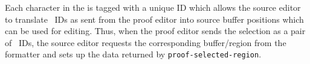 Each character in the {\IRS} is tagged with a unique ID which allows the
source editor to translate \tbox~IDs as sent from the proof editor into
source buffer positions which can be used for editing.  Thus, when the
proof editor sends the selection as a pair of \tbox~IDs, the source
editor requests the corresponding buffer/region from the formatter
and sets up the data returned by {\tt proof-selected-region}.
